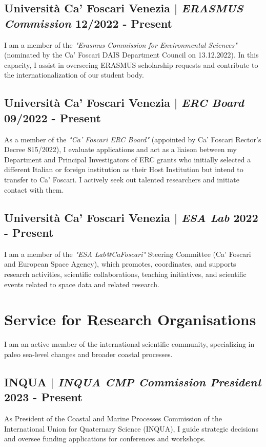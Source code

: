 \documentclass[11pt]{article}
\begin{document}
\subsection{Università Ca' Foscari Venezia  $|$ {\normalfont\textit{ERASMUS Commission}} \hfill 12/2022 - Present}
{\footnotesize I am a member of the \textit{"Erasmus Commission for Environmental Sciences"} (nominated by the Ca' Foscari DAIS Department Council on 13.12.2022). In this capacity, I assist in overseeing ERASMUS scholarship requests and contribute to the internationalization of our student body.}
\bigskip

\subsection{Università Ca' Foscari Venezia  $|$ {\normalfont\textit{ERC Board}} \hfill 09/2022 - Present}
{\footnotesize As a member of the \textit{"Ca' Foscari ERC Board"} (appointed by Ca' Foscari Rector’s Decree 815/2022), I evaluate applications and act as a liaison between my Department and Principal Investigators of ERC grants who initially selected a different Italian or foreign institution as their Host Institution but intend to transfer to Ca' Foscari. I actively seek out talented researchers and initiate contact with them.}
\bigskip

\subsection{Università Ca' Foscari Venezia  $|$ {\normalfont\textit{ESA Lab}} \hfill 2022 - Present}
{\footnotesize I am a member of the \textit{"ESA Lab@CaFoscari"} Steering Committee (Ca' Foscari and European Space Agency), which promotes, coordinates, and supports research activities, scientific collaborations, teaching initiatives, and scientific events related to space data and related research.}

\newpage
\section{Service for Research Organisations}
{\normalfont I am an active member of the international scientific community, specializing in paleo sea-level changes and broader coastal processes.}\\
\bigskip
\subsection{INQUA $|$ {\normalfont\textit{INQUA CMP Commission President}} \hfill 2023 - Present}
{\footnotesize As President of the Coastal and Marine Processes Commission of the International Union for Quaternary Science (INQUA), I guide strategic decisions and oversee funding applications for conferences and workshops.}
\bigskip
\end{document}
